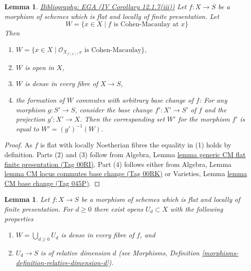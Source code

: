 \documentclass{amsart}
\newenvironment{reference}{\comment}{\endcomment}
\theoremstyle{plain}
\newtheorem{lemma}[subsection]{Lemma}
\theoremstyle{definition}
\theoremstyle{remark}
\numberwithin{equation}{subsection}
\begin{document}
\begin{lemma}
\label{more-morphisms-lemma-flat-finite-presentation-CM-open}
\begin{reference}
\href{https://stacks.math.columbia.edu/bibliography}{Bibliography: EGA (IV Corollary 12.1.7(iii))}
\end{reference}
Let $f : X \to S$ be a morphism of schemes which is flat and locally
of finite presentation. Let
$$
W = \{x \in X \mid f\text{ is Cohen-Macaulay at }x\}
$$
Then
\begin{enumerate}
\item $W = \{x \in X \mid \mathcal{O}_{X_{f(x)}, x}\text{ is Cohen-Macaulay}\}$,
\item $W$ is open in $X$,
\item $W$ is dense in every fibre of $X \to S$,
\item the formation of $W$ commutes with arbitrary base change of $f$:
For any morphism $g : S' \to S$, consider
the base change $f' : X' \to S'$ of $f$ and the
projection $g' : X' \to X$. Then the corresponding
set $W'$ for the morphism $f'$ is equal to $W' = (g')^{-1}(W)$.
\end{enumerate}
\end{lemma}

\begin{proof}
As $f$ is flat with locally Noetherian fibres the equality in (1) holds
by definition. Parts (2) and (3) follow from
Algebra, Lemma \href{https://stacks.math.columbia.edu/tag/00RI}{lemma generic CM flat finite presentation (Tag 00RI)}.
Part (4) follows either from
Algebra, Lemma \href{https://stacks.math.columbia.edu/tag/00RK}{lemma CM locus commutes base change (Tag 00RK)}
or
Varieties, Lemma \href{https://stacks.math.columbia.edu/tag/045P}{lemma CM base change (Tag 045P)}.
\end{proof}


\begin{lemma}
\label{more-morphisms-lemma-flat-finite-presentation-CM-pieces}
Let $f : X \to S$ be a morphism of schemes which is flat and locally
of finite presentation. For $d \geq 0$ there exist opens $U_d \subset X$
with the following properties
\begin{enumerate}
\item $W = \bigcup_{d \geq 0} U_d$ is dense in every fibre of $f$, and
\item $U_d \to S$ is of relative dimension $d$ (see
Morphisms, Definition \ref{morphisms-definition-relative-dimension-d}).
\end{enumerate}
\end{lemma}
\end{document}
